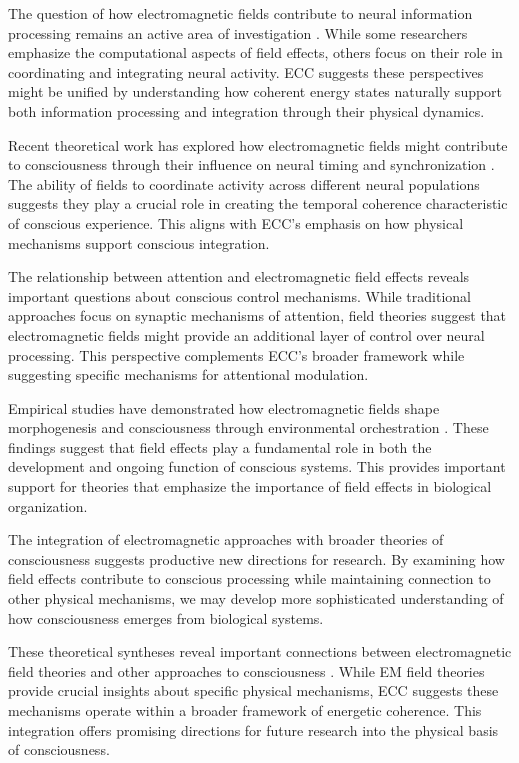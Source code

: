 The question of how electromagnetic fields contribute to neural information processing remains an active area of investigation \cite{Barrett2011}. While some researchers emphasize the computational aspects of field effects, others focus on their role in coordinating and integrating neural activity. ECC suggests these perspectives might be unified by understanding how coherent energy states naturally support both information processing and integration through their physical dynamics.

Recent theoretical work has explored how electromagnetic fields might contribute to consciousness through their influence on neural timing and synchronization \cite{Pockett2012}. The ability of fields to coordinate activity across different neural populations suggests they play a crucial role in creating the temporal coherence characteristic of conscious experience. This aligns with ECC's emphasis on how physical mechanisms support conscious integration.

The relationship between attention and electromagnetic field effects \cite{Prinz2012} reveals important questions about conscious control mechanisms. While traditional approaches focus on synaptic mechanisms of attention, field theories suggest that electromagnetic fields might provide an additional layer of control over neural processing. This perspective complements ECC's broader framework while suggesting specific mechanisms for attentional modulation.

Empirical studies have demonstrated how electromagnetic fields shape morphogenesis and consciousness through environmental orchestration \cite{Rouleau2014}. These findings suggest that field effects play a fundamental role in both the development and ongoing function of conscious systems. This provides important support for theories that emphasize the importance of field effects in biological organization.

The integration of electromagnetic approaches with broader theories of consciousness \cite{McFadden2020} suggests productive new directions for research. By examining how field effects contribute to conscious processing while maintaining connection to other physical mechanisms, we may develop more sophisticated understanding of how consciousness emerges from biological systems.

These theoretical syntheses reveal important connections between electromagnetic field theories and other approaches to consciousness \cite{John2001}. While EM field theories provide crucial insights about specific physical mechanisms, ECC suggests these mechanisms operate within a broader framework of energetic coherence. This integration offers promising directions for future research into the physical basis of consciousness.

